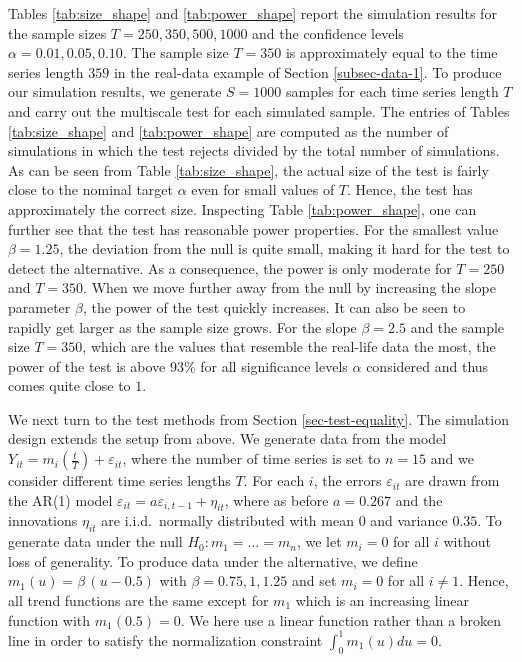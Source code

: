 Tables \ref{tab:size_shape} and \ref{tab:power_shape} report the simulation results for the sample sizes $T=250,350,500, 1000$ and the confidence levels $\alpha = 0.01, 0.05, 0.10$. The sample size $T = 350$ is approximately equal to the time series length $359$ in the real-data example of Section \ref{subsec-data-1}. To produce our simulation results, we generate $S=1000$ samples for each time series length $T$ and carry out the multiscale test for each simulated sample. The entries of Tables \ref{tab:size_shape} and \ref{tab:power_shape} are computed as the number of simulations in which the test rejects divided by the total number of simulations. As can be seen from Table \ref{tab:size_shape}, the actual size of the test is fairly close to the nominal target $\alpha$ even for small values of $T$. Hence, the test has approximately the correct size. Inspecting Table \ref{tab:power_shape}, one can further see that the test has reasonable power properties. For the smallest value $\beta = 1.25$, the deviation from the null is quite small, making it hard for the test to detect the alternative. As a consequence, the power is only moderate for $T=250$ and $T=350$. When we move further away from the null by increasing the slope parameter $\beta$, the power of the test quickly increases. It can also be seen to rapidly get larger as the sample size grows. For the slope $\beta =2.5$ and the sample size $T=350$, which are the values that resemble the real-life data the most, the power of the test is above $93\%$ for all significance levels $\alpha$ considered and thus comes quite close to $1$. 


We next turn to the test methods from Section \ref{sec-test-equality}. The simulation design extends the setup from above. We generate data from the model $Y_{it} = m_i(\frac{t}{T}) + \varepsilon_{it}$, where the number of time series is set to $n = 15$ and we consider different time series lengths $T$. For each $i$, the errors $\varepsilon_{it}$ are drawn from the AR(1) model $\varepsilon_{it} = a \varepsilon_{i,t-1} + \eta_{it}$, where as before $a = 0.267$ and the innovations $\eta_{it}$ are i.i.d.\ normally distributed with mean $0$ and variance $0.35$. To generate data under the null $H_0: m_1 = \ldots = m_n$, we let $m_i = 0$ for all $i$ without loss of generality. To produce data under the alternative, we define $m_1(u) = \beta \, (u - 0.5) $ with $\beta = 0.75, 1, 1.25$ and set $m_i = 0$ for all $i \ne 1$. Hence, all trend functions are the same except for $m_1$ which is an increasing linear function with $m_1(0.5) = 0$. We here use a linear function rather than a broken line in order to satisfy the normalization constraint $\int_0^1 m_1(u) du = 0$. 



